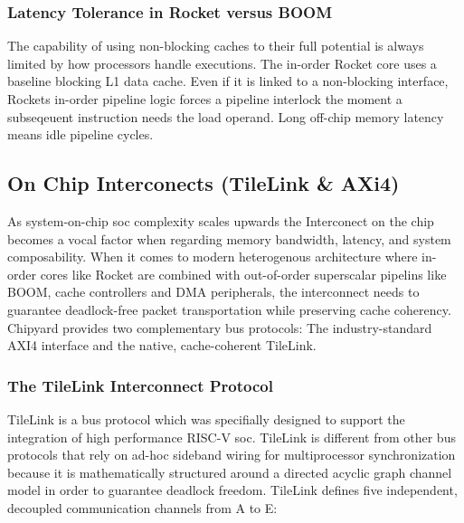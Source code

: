 \subsubsection{Latency Tolerance in Rocket versus BOOM}

The capability of using non-blocking caches to their full potential is always limited by how processors handle executions. 
The in-order Rocket core uses a baseline blocking L1 data cache.
Even if it is linked to a non-blocking interface, Rockets in-order pipeline logic forces a pipeline interlock the moment a subseqeuent instruction needs the load operand. %
Long off-chip memory latency means idle pipeline cycles.





\subsection{On Chip Interconects (TileLink \& AXi4)}

As system-on-chip \gls{soc} complexity scales upwards the Interconect on the chip becomes a vocal factor when regarding memory bandwidth, latency, and system composability.
When it comes to modern heterogenous architecture where in-order cores like Rocket are combined with out-of-order superscalar pipelins like BOOM, cache controllers and DMA peripherals,
the interconnect needs to guarantee deadlock-free packet transportation while preserving cache coherency.
Chipyard provides two complementary bus protocols: The industry-standard AXI4 interface and the native, cache-coherent TileLink.

\subsubsection{The TileLink Interconnect Protocol}

TileLink is a bus protocol which was specifially designed to support the integration of high performance RISC-V soc. \cite{cook2017tilelink}
TileLink is different from other bus protocols that rely on ad-hoc sideband wiring for multiprocessor synchronization because it is mathematically structured around a directed acyclic graph channel model in order to guarantee deadlock freedom.
TileLink defines five independent, decoupled communication channels from A to E:

